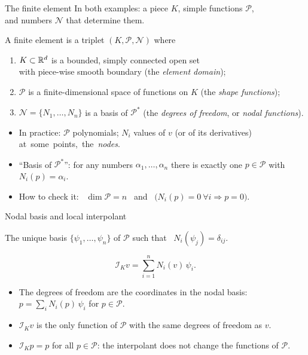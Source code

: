 \begin{frame}{The finite element}
    In both examples: a piece $K$, simple functions $\mathcal P$,\\ and numbers $\mathcal N$ that determine them.
    \begin{definition}
        A finite element is a triplet $(K, \mathcal P, \mathcal N)$ where
        \begin{enumerate}
            \item $K \subset {\mathbb R}^d$ is a bounded, simply connected open set\\ with piece-wise smooth boundary (the \emph{element domain});
            \item $\mathcal P$ is a finite-dimensional space of functions on $K$ (the \emph{shape functions});
            \item $\mathcal N = \{N_1, \dots, N_n\}$ is a basis of $\mathcal P^*$ (the \emph{degrees of freedom}, or \emph{nodal functions}).
        \end{enumerate}
    \end{definition}
    \begin{itemize}
        \item In practice: $\mathcal P$ polynomials; $N_i$ values of $v$ (or of its derivatives) \mbox{at some points, the \emph{nodes}.}
        \item ``Basis of $\mathcal P^*$'': for any numbers $\alpha_1, \dots, \alpha_n$ there is exactly one $p \in \mathcal P$ \mbox{with $N_i(p) = \alpha_i$.}
        \item How to check it: \ $\dim \mathcal P = n$ \ and \ $\big( N_i(p) = 0 \ \forall i \Rightarrow p = 0 \big)$.
    \end{itemize}
\end{frame}

\begin{frame}{Nodal basis and local interpolant}
    \begin{definition}
        The unique basis $\{\psi_1, \dots, \psi_n\}$ of $\mathcal P$ such that \ $N_i(\psi_j) = \delta_{ij}$.
    \end{definition}
    \begin{definition}
        \[
            \mathcal I_K v = \sum_{i=1}^n N_i(v)\, \psi_i .
        \]
    \end{definition}
    \begin{itemize}
        \item The degrees of freedom are the coordinates in the nodal basis:\\ $p = \sum_i N_i(p)\, \psi_i$ for $p \in \mathcal P$.
        \item $\mathcal I_K v$ is the only function of $\mathcal P$ with the same degrees of freedom as $v$.
        \item \alert{$\mathcal I_K p = p$ for all $p \in \mathcal P$}: the interpolant does not change the functions of $\mathcal P$.
    \end{itemize}
\end{frame}

